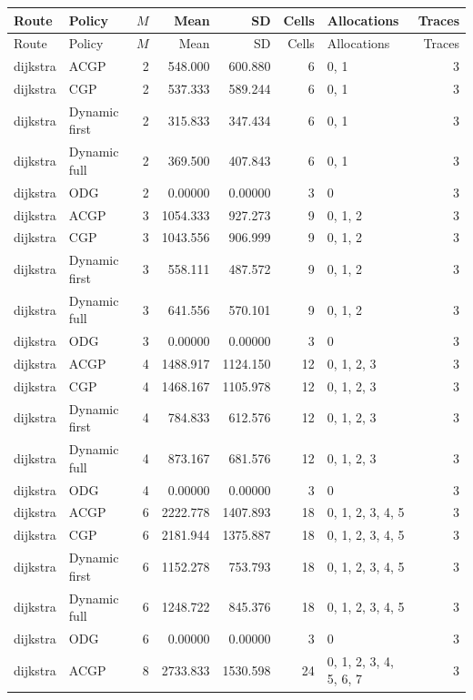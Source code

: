 \documentclass[10pt,a4paper]{article}
\begin{document}
\tiny\setlength{\tabcolsep}{2pt}\begin{longtable}{@{}p{23mm}p{29mm}rrrrp{36mm}r@{}}
\toprule Route & Policy & $M$ & Mean & SD & Cells & Allocations & Traces \\ \midrule\endfirsthead
\toprule Route & Policy & $M$ & Mean & SD & Cells & Allocations & Traces \\ \midrule\endhead
\bottomrule\endfoot
dijkstra & ACGP & 2 & 548.000 & 600.880 & 6 & 0, 1 & 3 \\
dijkstra & CGP & 2 & 537.333 & 589.244 & 6 & 0, 1 & 3 \\
dijkstra & Dynamic first & 2 & 315.833 & 347.434 & 6 & 0, 1 & 3 \\
dijkstra & Dynamic full & 2 & 369.500 & 407.843 & 6 & 0, 1 & 3 \\
dijkstra & ODG & 2 & 0.00000 & 0.00000 & 3 & 0 & 3 \\
dijkstra & ACGP & 3 & 1054.333 & 927.273 & 9 & 0, 1, 2 & 3 \\
dijkstra & CGP & 3 & 1043.556 & 906.999 & 9 & 0, 1, 2 & 3 \\
dijkstra & Dynamic first & 3 & 558.111 & 487.572 & 9 & 0, 1, 2 & 3 \\
dijkstra & Dynamic full & 3 & 641.556 & 570.101 & 9 & 0, 1, 2 & 3 \\
dijkstra & ODG & 3 & 0.00000 & 0.00000 & 3 & 0 & 3 \\
dijkstra & ACGP & 4 & 1488.917 & 1124.150 & 12 & 0, 1, 2, 3 & 3 \\
dijkstra & CGP & 4 & 1468.167 & 1105.978 & 12 & 0, 1, 2, 3 & 3 \\
dijkstra & Dynamic first & 4 & 784.833 & 612.576 & 12 & 0, 1, 2, 3 & 3 \\
dijkstra & Dynamic full & 4 & 873.167 & 681.576 & 12 & 0, 1, 2, 3 & 3 \\
dijkstra & ODG & 4 & 0.00000 & 0.00000 & 3 & 0 & 3 \\
dijkstra & ACGP & 6 & 2222.778 & 1407.893 & 18 & 0, 1, 2, 3, 4, 5 & 3 \\
dijkstra & CGP & 6 & 2181.944 & 1375.887 & 18 & 0, 1, 2, 3, 4, 5 & 3 \\
dijkstra & Dynamic first & 6 & 1152.278 & 753.793 & 18 & 0, 1, 2, 3, 4, 5 & 3 \\
dijkstra & Dynamic full & 6 & 1248.722 & 845.376 & 18 & 0, 1, 2, 3, 4, 5 & 3 \\
dijkstra & ODG & 6 & 0.00000 & 0.00000 & 3 & 0 & 3 \\
dijkstra & ACGP & 8 & 2733.833 & 1530.598 & 24 & 0, 1, 2, 3, 4, 5, 6, 7 & 3 \\

\end{longtable}
\end{document}
